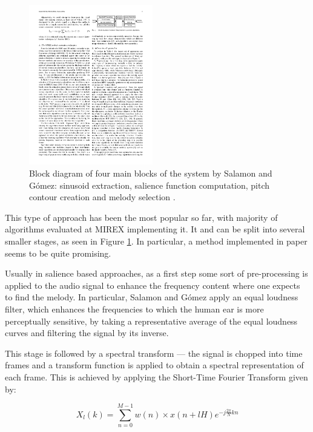 \begin{figure}
  \vspace{-30pt}
  \begin{center}
    \includegraphics[width=0.48\textwidth]{Figures/salienceoveralldiagram}
  \end{center}
  \caption{Block diagram of four main blocks of the system by Salamon and G\'{o}mez: sinusoid extraction, salience function computation, pitch contour creation and melody selection \cite{comparison}.}
  \label{fig:3stepsalience}
\end{figure}

This type of approach has been the most popular so far, with majority of algorithms evaluated at MIREX implementing it. It and can be split into several smaller stages, as seen in Figure \ref{fig:3stepsalience}. In particular, a method implemented in paper \cite{salamon} seems to be quite promising.

Usually in salience based approaches, as a first step some sort of pre-processing is applied to the audio signal to enhance the frequency content where one expects to find the melody. In particular, Salamon and G\'{o}mez apply an equal loudness filter, which enhances the frequencies to which the human ear is more perceptually sensitive, by taking a representative average of the equal loudness curves and filtering the signal by its inverse. 

This stage is followed by a spectral transform — the signal is chopped into time frames and a transform function is applied to obtain a spectral representation of each frame.
This is achieved by applying the Short-Time Fourier Transform given by:

\begin{equation}
X_{l}(k) = \sum_{n=0}^{M-1} w(n) \times x(n + lH) e^{-j\frac{2 \pi}{N}kn}
\end{equation}

